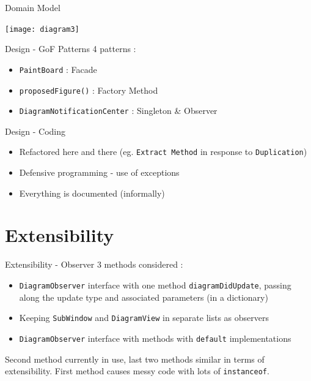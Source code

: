 \documentclass[10pt]{beamer}
\begin{document}
\begin{frame}[fragile]{Domain Model}
	\begin{center}
	\texttt{[image: diagram3]}
	\end{center}
\end{frame}

\begin{frame}[fragile]{Design - GoF Patterns}
4 patterns :
\begin{itemize}
\item \texttt{PaintBoard} : Facade
\item \texttt{proposedFigure()} : Factory Method
\item \texttt{DiagramNotificationCenter} : Singleton \& Observer
\end{itemize}
\end{frame}

\begin{frame}[fragile]{Design - Coding}
\begin{itemize}
\item Refactored here and there (eg. \texttt{Extract Method} in response to \texttt{Duplication})
\item Defensive programming - use of exceptions
\item Everything is documented (informally)
\end{itemize}
\end{frame}

\section{Extensibility}

\begin{frame}[fragile]{Extensibility - Observer}
3 methods considered :
\begin{itemize}
\item \texttt{DiagramObserver} interface with one method \texttt{diagramDidUpdate}, passing along the update type and associated parameters (in a dictionary)
\item Keeping \texttt{SubWindow} and \texttt{DiagramView} in separate lists as observers
\item \texttt{DiagramObserver} interface with methods with \texttt{default} implementations
\end{itemize}
Second method currently in use, last two methods similar in terms of extensibility. First method causes messy code with lots of \texttt{instanceof}.
\end{frame}
\end{document}
